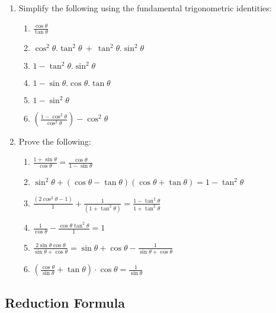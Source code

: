 {
\begin{enumerate}
	\item Simplify the following using the fundamental trigonometric identities:
	\begin{enumerate}
		\item $\frac{\cos\theta }{\tan\theta }$
		\item $\cos^2\theta.\tan^2\theta\ +\ \tan^2\theta.\sin^2\theta$
		\item $1 - \tan^2\theta.\sin^2\theta$
		\item $1 - \sin\theta.\cos\theta.\tan\theta $
		\item $1-\sin^2\theta $
		\item $\left(\frac{1 - \cos^2\theta }{\cos^2\theta }\right) - \cos^2\theta$
	\end{enumerate}
	\item Prove the following:
	\begin{enumerate}
		\item $\frac{1 + \sin\theta}{\cos\theta} = \frac{\cos\theta}{1 - \sin\theta}$
		\item $\sin^2\theta + (\cos\theta - \tan\theta)(\cos\theta + \tan\theta)  = 1 - \tan^2\theta$
		\item $\frac{(2\cos^2\theta - 1)}{1} + \frac{1}{(1 + \tan^2\theta)} = \frac{1 - \tan^2\theta}{1 + \tan^2\theta}$
		\item $\frac{1}{\cos\theta} - \frac{\cos\theta\tan^2\theta}{1} = 1$
		\item $\frac{2\sin\theta\cos\theta}{\sin\theta+\cos\theta} = \sin\theta+\cos\theta - \frac{1}{\sin\theta+\cos\theta}$
		\item $\left(\frac{\cos\theta}{\sin\theta} + \tan\theta \right)\cdot\cos\theta = \frac{1}{\sin\theta}$
	\end{enumerate}
\end{enumerate}
}%


\subsection{Reduction Formula}


